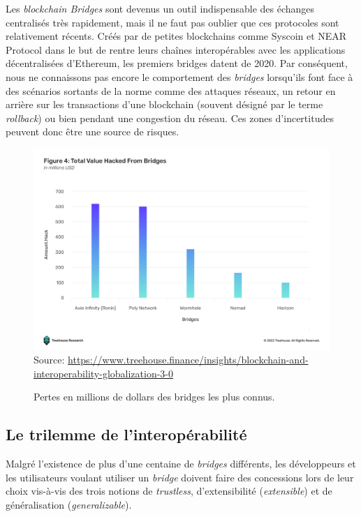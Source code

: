 Les \textit{\gls{blockchain} Bridges} sont devenus un outil indispensable des échanges centralisés très rapidement, mais il ne faut pas oublier que ces protocoles sont relativement récents. Créés par de petites \gls{blockchain}s comme Syscoin et NEAR Protocol dans le but de rentre leurs chaînes interopérables avec les applications décentralisées d’\gls{Ethereum}, les premiers bridges datent de 2020\cite{Bitstamp}. Par conséquent, nous ne connaissons pas encore le comportement des \textit{bridges} lorsqu’ils font face à des scénarios sortants de la norme comme des attaques réseaux, un retour en arrière sur les transactions d’une \gls{blockchain} (souvent désigné par le terme \textit{rollback}) ou bien pendant une congestion du réseau. Ces zones d’incertitudes peuvent donc être une source de risques. \\

\begin{figure}[h!]
    \centering
\includegraphics[scale=0.30]{centralisation/imagesBridges/GraphLossesBridges.png}
    {\scriptsize
            Source: \url{https://www.treehouse.finance/insights/blockchain-and-interoperability-globalization-3-0}}
    \caption{Pertes en millions de dollars des bridges les plus connus.}
    \label{fig:GraphBridges}
\end{figure}

\subsection{Le trilemme de l’interopérabilité}

Malgré l’existence de plus d’une centaine de \textit{bridges} différents, les développeurs et les utilisateurs voulant utiliser un \textit{bridge} doivent faire des concessions lors de leur choix vis-à-vis des trois notions de \textit{trustless}, d’extensibilité (\textit{extensible}) et de généralisation (\textit{generalizable}).\\

